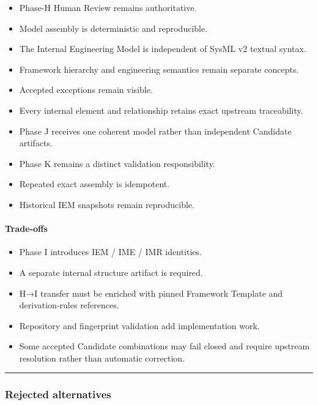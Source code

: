 \begin{itemize}
\tightlist
\item
  Phase-H Human Review remains authoritative.
\item
  Model assembly is deterministic and reproducible.
\item
  The Internal Engineering Model is independent of SysML v2 textual syntax.
\item
  Framework hierarchy and engineering semantics remain separate concepts.
\item
  Accepted exceptions remain visible.
\item
  Every internal element and relationship retains exact upstream traceability.
\item
  Phase J receives one coherent model rather than independent Candidate artifacts.
\item
  Phase K remains a distinct validation responsibility.
\item
  Repeated exact assembly is idempotent.
\item
  Historical IEM snapshots remain reproducible.
\end{itemize}

\hypertarget{trade-offs-1}{%
\paragraph{Trade-offs}\label{trade-offs-1}}

\begin{itemize}
\tightlist
\item
  Phase I introduces IEM / IME / IMR identities.
\item
  A separate internal structure artifact is required.
\item
  H→I transfer must be enriched with pinned Framework Template and derivation-rules references.
\item
  Repository and fingerprint validation add implementation work.
\item
  Some accepted Candidate combinations may fail closed and require upstream resolution rather than automatic correction.
\end{itemize}

\begin{center}\rule{0.5\linewidth}{0.5pt}\end{center}

\hypertarget{rejected-alternatives-3}{%
\subsubsection{Rejected alternatives}\label{rejected-alternatives-3}}

